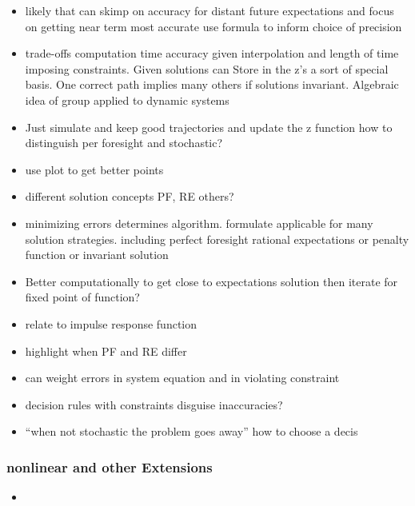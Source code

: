 \documentclass{beamer}
\begin{document}
\begin{frame}
\begin{itemize}
 \item likely that can skimp on accuracy for distant future expectations and focus on getting near term most accurate use formula to inform choice of precision
 \item trade-offs computation time accuracy given interpolation and length of time imposing constraints.  Given solutions can Store in the z's a sort of special basis. One correct path implies many others if solutions invariant.   Algebraic idea of group applied to dynamic systems
 \item Just simulate and keep good trajectories and update the z function how to distinguish per foresight and stochastic?
 \item use plot to get better points
 \item different solution concepts PF, RE others?
      \item minimizing errors determines algorithm. formulate applicable for many solution strategies.  including perfect foresight rational expectations or penalty function or invariant solution
 \item Better computationally to get close to expectations solution then iterate for fixed point of function?
     \item relate to \citep{hintermaier10,Christiano2000} impulse response function
     \item highlight when PF and RE differ
 \item can weight errors in system equation and in violating constraint
    	\item decision rules with constraints disguise inaccuracies?
     \item ``when not stochastic the problem goes away''  how to choose a decis%
     \end{itemize}
   \end{frame}
 



  \begin{frame}
     \frametitle{nonlinear and other Extensions}
     \begin{itemize}
     \item 
     \end{itemize}
   \end{frame}
\end{document}
